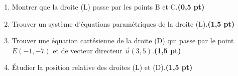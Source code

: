 \documentclass{article}
\begin{document}
\begin{enumerate}
    \item Montrer que la droite (L) passe par les points B et C.\textbf{(0,5 pt)}

    \item Trouver un système d’équations paramétriques de la droite (L).\textbf{(1,5 pt)}

    \item Trouver une équation cartésienne de la droite (D) qui passe par le point \(E(-1, -7)\) et de vecteur directeur \(\vec{u}(3, 5)\).\textbf{(1,5 pt)}

    \item Étudier la position relative des droites (L) et (D).\textbf{(1,5 pt)}
\end{enumerate}





        
\end{document}
